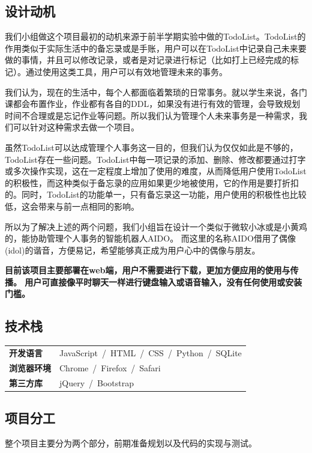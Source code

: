 \documentclass[logo,reportComp]{thesis}
\begin{document}
\subsection{设计动机}
我们小组做这个项目最初的动机来源于前半学期实验中做的TodoList。TodoList的作用类似于实际生活中的备忘录或是手账，用户可以在TodoList中记录自己未来要做的事情，并且可以修改记录，或者是对记录进行标记（比如打上已经完成的标记）。通过使用这类工具，用户可以有效地管理未来的事务。

我们认为，现在的生活中，每个人都面临着繁琐的日常事务。就以学生来说，各门课都会布置作业，作业都有各自的DDL，如果没有进行有效的管理，会导致规划时间不合理或是忘记作业等问题。所以我们认为管理个人未来事务是一种需求，我们可以针对这种需求去做一个项目。

虽然TodoList可以达成管理个人事务这一目的，但我们认为仅仅如此是不够的，TodoList存在一些问题。TodoList中每一项记录的添加、删除、修改都要通过打字或多次操作实现，这在一定程度上增加了使用的难度，从而降低用户使用TodoList的积极性，而这种类似于备忘录的应用如果更少地被使用，它的作用是要打折扣的。同时，TodoList的功能单一，只有备忘录这一功能，用户使用的积极性也比较低，这会带来与前一点相同的影响。

所以为了解决上述的两个问题，我们小组旨在设计一个类似于微软小冰或是小黄鸡的，能协助管理个人事务的智能机器人AIDO。
而这里的名称AIDO借用了偶像(idol)的谐音，方便易记，希望能够真正成为用户心中的偶像与朋友。

\textbf{目前该项目主要部署在web端，用户不需要进行下载，更加方便应用的使用与传播。
用户可直接像平时聊天一样进行键盘输入或语音输入，没有任何使用或安装门槛。}

\subsection{技术栈}
\begin{flushleft}
\begin{tabular}{ll}
\textbf{开发语言} &\qquad JavaScript\ /\ HTML\ /\ CSS\ /\ Python\ /\ SQLite\\
\textbf{浏览器环境} &\qquad Chrome\ /\ Firefox\ /\ Safari\\
\textbf{第三方库}  &\qquad jQuery\ /\ Bootstrap
\end{tabular}
\end{flushleft}

\subsection{项目分工}
整个项目主要分为两个部分，前期准备规划以及代码的实现与测试。
\end{document}
